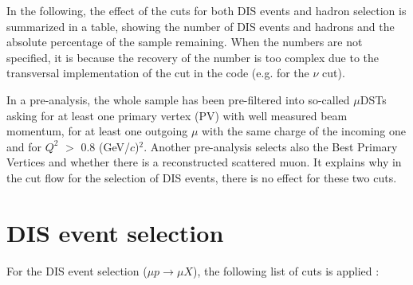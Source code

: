 In the following, the effect of the cuts for both DIS events and hadron selection is summarized in a table, showing the number of DIS events and hadrons and the absolute percentage of the sample remaining. When the numbers are not specified, it is because the recovery of the number is too complex due to the transversal implementation of the cut in the code (e.g. for the $\nu$ cut).

In a pre-analysis, the whole sample has been pre-filtered into so-called $\mu$DSTs asking for at least one primary vertex (PV) with well measured beam momentum, for at least one outgoing $\mu$ with the same charge of the incoming one and for $Q^2$ $>$ 0.8 (GeV/$c$)$^2$. Another pre-analysis selects also the Best Primary Vertices and whether there is a reconstructed scattered muon. It explains why in the cut flow for the selection of DIS events, there is no effect for these two cuts.


\section{DIS event selection}

For the DIS event selection ($\mu p \rightarrow \mu X$), the following list of cuts is applied :

\newpage


